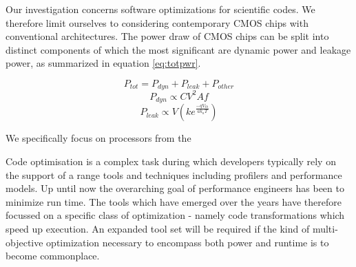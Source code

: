 Our investigation concerns software optimizations for scientific codes. We therefore limit ourselves to considering contemporary CMOS chips with conventional architectures. The power draw of CMOS chips can be split into distinct components of which the most significant are dynamic power and leakage power, as summarized in equation \ref{eq:totpwr}.\golden

\begin{equation}
\label{eq:totpwr}
P_{tot} = P_{dyn} + P_{leak} + P_{other}
\end{equation}
\begin{equation} 
\label{eq:dynpwr}
P_{dyn} \propto CV^{2}Af
\end{equation}
\begin{equation}
\label{eq:leakpwr}
P_{leak} \propto V\left(ke^{\frac{-qV_{th}}{ak_{a}T}}\right)
\end{equation}












 We specifically focus on processors from the



Code optimisation is a complex task during which developers typically rely on the support of a range tools and techniques including profilers and performance models. Up until now the overarching goal of performance engineers has been to minimize run time. The tools which have emerged over the years have therefore focussed on a specific class of optimization - namely code transformations which speed up execution. An expanded tool set will be required if the kind of multi-objective optimization necessary to encompass both power and runtime is to become commonplace.

